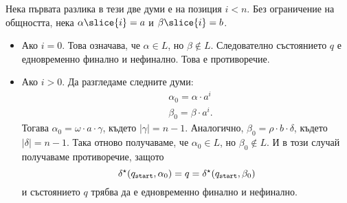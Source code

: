 \begin{hint}
  Нека първата разлика в тези две думи е на позиция $i < n$.
  Без ограничение на общността, нека $\alpha\slice{i} = a$ и $\beta\slice{i} = b$.
  \begin{itemize}
  \item
    Ако $i = 0$.
    Това означава, че $\alpha \in L$, но $\beta \not\in L$.
    Следователно състоянието $q$ е едновременно финално и нефинално. Това е противоречие.
  \item
    Ако $i > 0$. Да разгледаме следните думи:
    \begin{align*}
      & \alpha_0 = \alpha \cdot a^{i}\\
      & \beta_0 = \beta \cdot a^{i}.
    \end{align*}
    Тогава $\alpha_0 = \omega \cdot a \cdot \gamma$, където $|\gamma| = n-1$. Аналогично,
    $\beta_0 = \rho \cdot b \cdot \delta$, където $|\delta| = n-1$.
    Така отново получаваме, че $\alpha_0 \in L$, но $\beta_0 \not\in L$.
    И в този случай получаваме противоречие, защото
    \[\delta^\star(q_{\texttt{start}},\alpha_0) = q = \delta^\star(q_{\texttt{start}},\beta_0)\]
    и състоянието $q$ трябва да е едновременно финално и нефинално.
  \end{itemize}  
\end{hint}

